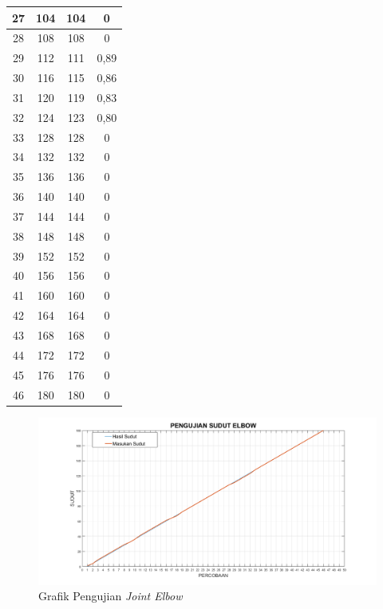 \begin{longtable}{|c|c|c|c|}
 	27 & 104     & 104      & 0           \\ \hline
 	28 & 108     & 108      & 0           \\ \hline
 	29 & 112     & 111      & 0,89 \\ \hline
 	30 & 116     & 115      & 0,86 \\ \hline
 	31 & 120     & 119      & 0,83 \\ \hline
 	32 & 124     & 123      & 0,80 \\ \hline
 	33 & 128     & 128      & 0           \\ \hline
 	34 & 132     & 132      & 0           \\ \hline
 	35 & 136     & 136      & 0           \\ \hline
 	36 & 140     & 140      & 0           \\ \hline
 	37 & 144     & 144      & 0           \\ \hline
 	38 & 148     & 148      & 0           \\ \hline
 	39 & 152     & 152      & 0           \\ \hline
 	40 & 156     & 156      & 0           \\ \hline
 	41 & 160     & 160      & 0           \\ \hline
 	42 & 164     & 164      & 0           \\ \hline
 	43 & 168     & 168      & 0           \\ \hline
 	44 & 172     & 172      & 0           \\ \hline
 	45 & 176     & 176      & 0           \\ \hline
 	46 & 180     & 180      & 0           \\ \hline
 \end{longtable}
 \begin{figure}[H]
 	\centering
 	\includegraphics[width=12cm]{gambar/pe.png}
 	\caption{Grafik Pengujian \textit{Joint Elbow}}
 	\label{pic.jointelbow}
 \end{figure}
 

